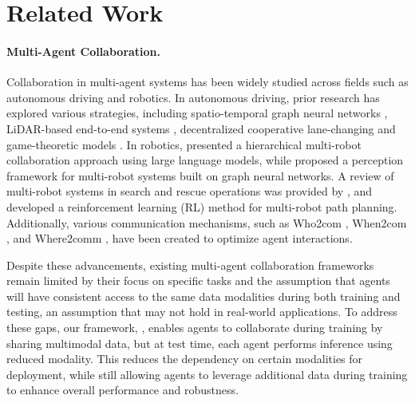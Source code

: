 \section{Related Work}

\paragraph{Multi-Agent Collaboration.}
Collaboration in multi-agent systems has been widely studied across fields such as autonomous driving and robotics. In autonomous driving, prior research has explored various strategies, including spatio-temporal graph neural networks \citep{gao2024collaborative}, LiDAR-based end-to-end systems \citep{cui2022coopernaut}, decentralized cooperative lane-changing \citep{nie2016decentralized} and game-theoretic models \citep{hang2021decision}. In robotics, \citet{mandi2024roco} presented a hierarchical multi-robot collaboration approach using large language models, while \citet{zhou2022multi} proposed a perception framework for multi-robot systems built on graph neural networks. A review of multi-robot systems in search and rescue operations was provided by \cite{queralta2020collaborative}, and \citet{bae2019multi} developed a reinforcement learning (RL) method for multi-robot path planning. Additionally, various communication mechanisms, such as Who2com \citep{liu2020who2com}, When2com \citep{liu2020when2com}, and Where2comm \citep{hu2022where2comm}, have been created to optimize agent interactions.

Despite these advancements, existing multi-agent collaboration frameworks remain limited by their focus on specific tasks and the assumption that agents will have consistent access to the same data modalities during both training and testing, an assumption that may not hold in real-world applications. To address these gaps, our framework, \ours, enables agents to collaborate during training by sharing multimodal data, but at test time, each agent performs inference using reduced modality. This reduces the dependency on certain modalities for deployment, while still allowing agents to leverage additional data during training to enhance overall performance and robustness.
\vspace{-6pt}
